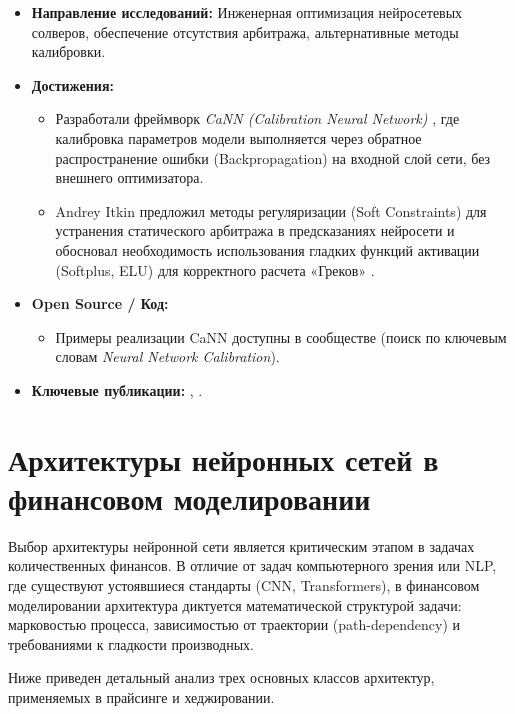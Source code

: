 \begin{itemize}
    \item \textbf{Направление исследований:} Инженерная оптимизация нейросетевых солверов, обеспечение отсутствия арбитража, альтернативные методы калибровки.
    \item \textbf{Достижения:}
    \begin{itemize}
        \item Разработали фреймворк \textit{CaNN (Calibration Neural Network)} \cite{Liu2019}, где калибровка параметров модели выполняется через обратное распространение ошибки (Backpropagation) на входной слой сети, без внешнего оптимизатора.
        \item Andrey Itkin предложил методы регуляризации (Soft Constraints) для устранения статического арбитража в предсказаниях нейросети и обосновал необходимость использования гладких функций активации (Softplus, ELU) для корректного расчета «Греков» \cite{Itkin2019}.
    \end{itemize}
    \item \textbf{Open Source / Код:}
    \begin{itemize}
        \item Примеры реализации CaNN доступны в сообществе (поиск по ключевым словам \textit{Neural Network Calibration}).
    \end{itemize}
    \item \textbf{Ключевые публикации:} \cite{Liu2019}, \cite{Itkin2019}.
\end{itemize}

\section{Архитектуры нейронных сетей в финансовом моделировании}

Выбор архитектуры нейронной сети является критическим этапом в задачах количественных финансов. В отличие от задач компьютерного зрения или NLP, где существуют устоявшиеся стандарты (CNN, Transformers), в финансовом моделировании архитектура диктуется математической структурой задачи: марковостью процесса, зависимостью от траектории (path-dependency) и требованиями к гладкости производных.

Ниже приведен детальный анализ трех основных классов архитектур, применяемых в прайсинге и хеджировании.

